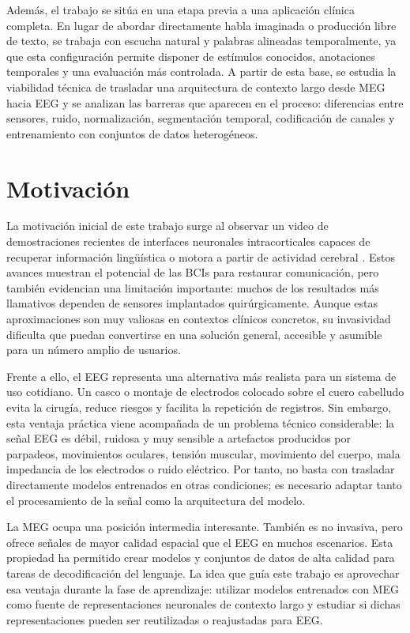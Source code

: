 Además, el trabajo se sitúa en una etapa previa a una aplicación clínica completa. En lugar de abordar directamente habla imaginada o producción libre de texto, se trabaja con escucha natural y palabras alineadas temporalmente, ya que esta configuración permite disponer de estímulos conocidos, anotaciones temporales y una evaluación más controlada. A partir de esta base, se estudia la viabilidad técnica de trasladar una arquitectura de contexto largo desde MEG hacia EEG y se analizan las barreras que aparecen en el proceso: diferencias entre sensores, ruido, normalización, segmentación temporal, codificación de canales y entrenamiento con conjuntos de datos heterogéneos.

\section{Motivación}

La motivación inicial de este trabajo surge al observar un video de demostraciones recientes de interfaces neuronales intracorticales capaces de recuperar información lingüística o motora a partir de actividad cerebral \cite{elpais_ann_bci_video, metzger2023highperformance}. Estos avances muestran el potencial de las BCIs para restaurar comunicación, pero también evidencian una limitación importante: muchos de los resultados más llamativos dependen de sensores implantados quirúrgicamente. Aunque estas aproximaciones son muy valiosas en contextos clínicos concretos, su invasividad dificulta que puedan convertirse en una solución general, accesible y asumible para un número amplio de usuarios.

Frente a ello, el EEG representa una alternativa más realista para un sistema de uso cotidiano. Un casco o montaje de electrodos colocado sobre el cuero cabelludo evita la cirugía, reduce riesgos y facilita la repetición de registros. Sin embargo, esta ventaja práctica viene acompañada de un problema técnico considerable: la señal EEG es débil, ruidosa y muy sensible a artefactos producidos por parpadeos, movimientos oculares, tensión muscular, movimiento del cuerpo, mala impedancia de los electrodos o ruido eléctrico. Por tanto, no basta con trasladar directamente modelos entrenados en otras condiciones; es necesario adaptar tanto el procesamiento de la señal como la arquitectura del modelo.

La MEG ocupa una posición intermedia interesante. También es no invasiva, pero ofrece señales de mayor calidad espacial que el EEG en muchos escenarios. Esta propiedad ha permitido crear modelos y conjuntos de datos de alta calidad para tareas de decodificación del lenguaje. La idea que guía este trabajo es aprovechar esa ventaja durante la fase de aprendizaje: utilizar modelos entrenados con MEG como fuente de representaciones neuronales de contexto largo y estudiar si dichas representaciones pueden ser reutilizadas o reajustadas para EEG.

